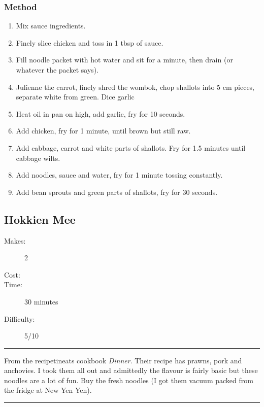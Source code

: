 \documentclass[]{article}
\begin{document}
\subsubsection*{\Large Method}
\begin{enumerate}[font=\huge\color{accent}]
	\item Mix sauce ingredients.
	\item Finely slice chicken and toss in 1 tbsp of sauce.
	\item Fill noodle packet with hot water and sit for a minute, then drain (or whatever the packet says).
	\item Julienne the carrot, finely shred the wombok, chop shallots into 5 cm pieces, separate white from green. Dice garlic
	\item Heat oil in pan on high, add garlic, fry for 10 seconds.
	\item Add chicken, fry for 1 minute, until brown but still raw.
	\item Add cabbage, carrot and white parts of shallots. Fry for 1.5 minutes until cabbage wilts.
	\item Add noodles, sauce and water, fry for 1 minute tossing constantly.
	\item Add bean sprouts and green parts of shallots, fry for 30 seconds.
\end{enumerate}
\newpage
{}\label{rec:Hokkien Mee}
\subsection*{\center\huge Hokkien Mee}
\begin{description}
\item[Makes:] 2 
\item[Cost:] \textdollar
\item[Time:] 30 minutes
\item[Difficulty:] 5/10
\end{description}
\vspace{0.2cm}\hrule\vspace{0.5cm}
\begin{adjustwidth}{0.5 cm}{0.5 cm}

From the recipetineats cookbook \textit{Dinner}. Their recipe has prawns, pork and anchovies. I took them all out and admittedly the flavour is fairly basic but these noodles are a lot of fun. Buy the fresh noodles (I got them vacuum packed from the fridge at New Yen Yen). \hfill{}\color{black}

\end{adjustwidth}
\vspace{0.5cm}\hrule
\end{document}
